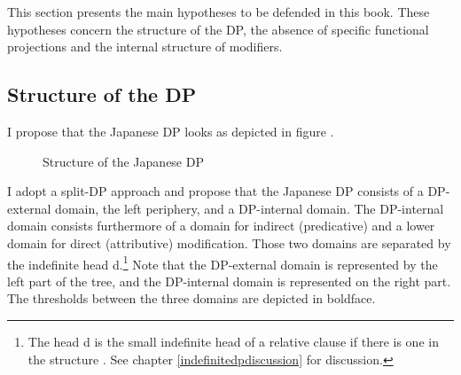 \documentclass [output=book,colorlinks,citecolor=brown]{langscibook}
\begin{document}
This section presents the main hypotheses to be defended in this book. These hypotheses concern the structure of the DP, the absence of specific functional projections and the internal structure of modifiers.

\subsection{Structure of the DP}

I propose that the Japanese DP looks as depicted in figure .

\newpage

\begin{figure}
 \centering
 \begin{subfigure}{0.5\textwidth}
 \centering
 \end{subfigure}
 \begin{subfigure}{0.5\textwidth}
 \centering
 \end{subfigure}
 \caption{Structure of the Japanese DP}
 \label{fig:Structure of the Japanese DP1}
\end{figure}



I adopt a split-DP approach \citep{laenzlinger:2005:french, laenzlinger:2011:elements, kim:2019:syntax} and propose that the Japanese DP consists of a DP-external domain, the left periphery, and a DP-internal domain. The DP-internal domain consists furthermore of a domain for indirect (predicative) and a lower domain for direct (attributive) modification. Those two domains are separated by the indefinite head d.\footnote{The head d is the small indefinite head of a relative clause if there is one in the structure \citep{cinque:2010:adj, cinque:2020:relcl}. See chapter \ref{indefinitedpdiscussion} for discussion.} Note that the DP-external domain is represented by the left part of the tree, and the DP-internal domain is represented on the right part. The thresholds between the three domains are depicted in boldface.
\end{document}
